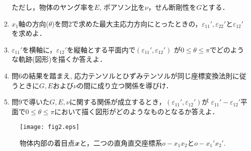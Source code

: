 \documentclass[10pt,a4j]{jarticle}
\begin{document}
\begin{enumerate}
	ただし，物体のヤング率を$E$, ポアソン比を$\nu$，せん断剛性を$G$とする．
\item
	$x_1$軸の方向($\theta$)を問2で求めた最大主応力方向にとったときの，$\varepsilon_{11}',\varepsilon_{22}'$と$\varepsilon_{12}'$
		を求めよ．
\item
	$\varepsilon_{11}'$を横軸に，$\varepsilon_{12}'$を縦軸とする平面内で$(\varepsilon_{11}',\varepsilon_{12}')$
	が$0\leq \theta \leq \pi$でどのような軌跡(図形)を描くか答えよ．
\item
	問6の結果を踏まえ,
	応力テンソルとひずみテンソルが同じ座標変換法則に従うときに$G,E$および$\nu$の間に成り立つ関係を導びけ．
\item
	問9で導いた$G,E,\nu$に関する関係が成立するとき，$(\varepsilon_{11}',\varepsilon_{12}')$が
	$\varepsilon_{11}'-\varepsilon_{12}'$平面で$0\leq \theta \leq \pi$において描く図形がどのようなものとなるか答えよ．
\end{enumerate}
\begin{figure}[h]
	\begin{center}
	\texttt{[image: fig2.eps]} 
	\end{center}
	\caption{物体内部の着目点$\mbox{\boldmath $x$}$と，二つの直角直交座標系$o-x_1x_2$と$o-x_1'x_2'$.} 
	\label{fig:fig2}
\end{figure}
\end{document}
